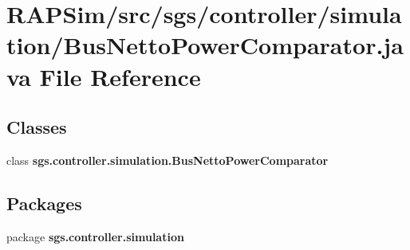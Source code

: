 \section{R\-A\-P\-Sim/src/sgs/controller/simulation/\-Bus\-Netto\-Power\-Comparator.java File Reference}
\label{_bus_netto_power_comparator_8java}
\subsection*{Classes}
\begin{DoxyCompactItemize}
\item 
class {\bf sgs.\-controller.\-simulation.\-Bus\-Netto\-Power\-Comparator}
\end{DoxyCompactItemize}
\subsection*{Packages}
\begin{DoxyCompactItemize}
\item 
package {\bf sgs.\-controller.\-simulation}
\end{DoxyCompactItemize}
